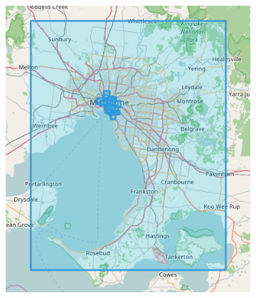 \begin{figure}[htbp]
\begin{subfigure}[htbp]{0.3\textwidth}
	\end{subfigure}
	\quad
	\begin{subfigure}[htbp]{0.3\textwidth}
		\centering
		\includegraphics[width=1\linewidth]{figures/melbourne_bbs.png}
		\caption{}
		\label{subfig:melbourne_bounding_boxes}
	\end{subfigure}
			
	\medskip
	

\end{figure}

